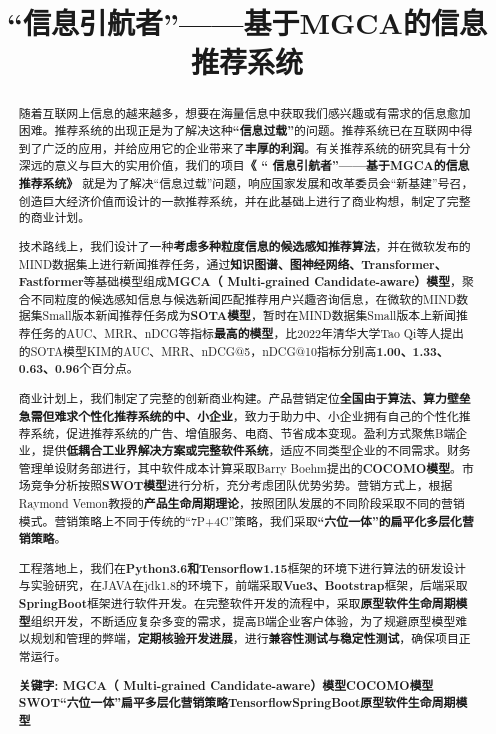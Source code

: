 \documentclass[withoutpreface,bwprint]{cumcmthesis} %
\title{“信息引航者”——基于MGCA的信息推荐系统}
\begin{document}
	
	\maketitle\thispagestyle{empty}
	\begin{abstract}
		随着互联网上信息的越来越多，想要在海量信息中获取我们感兴趣或有需求的信息愈加困难。推荐系统的出现正是为了解决这种\textbf{“信息过载”}的问题。推荐系统已在互联网中得到了广泛的应用，并给应用它的企业带来了\textbf{丰厚的利润}。有关推荐系统的研究具有十分深远的意义与巨大的实用价值，我们的项目\textbf{《 “ 信息引航者”——基于MGCA的信息推荐系统》 }就是为了解决“信息过载”问题，响应国家发展和改革委员会“新基建”号召，创造巨大经济价值而设计的一款推荐系统，并在此基础上进行了商业构想，制定了完整的商业计划。\par
		技术路线上，我们设计了一种\textbf{考虑多种粒度信息的候选感知推荐算法}，并在微软发布的MIND数据集上进行新闻推荐任务，通过\textbf{知识图谱、图神经网络、Transformer、Fastformer}等基础模型组成\textbf{MGCA（ Multi-grained Candidate-aware）模型}，聚合不同粒度的候选感知信息与候选新闻匹配推荐用户兴趣咨询信息，在微软的MIND数据集Small版本新闻推荐任务成为\textbf{SOTA模型}，暂时在MIND数据集Small版本上新闻推荐任务的AUC、MRR、nDCG等指标\textbf{最高的模型}，比2022年清华大学Tao Qi等人提出的SOTA模型KIM的AUC、MRR、nDCG@5，nDCG@10指标分别高\textbf{1.00、1.33、0.63、0.96}个百分点。\par
		商业计划上，我们制定了完整的创新商业构建。产品营销定位\textbf{全国由于算法、算力壁垒急需但难求个性化推荐系统的中、小企业}，致力于助力中、小企业拥有自己的个性化推荐系统，促进推荐系统的广告、增值服务、电商、节省成本变现。盈利方式聚焦B端企业，提供\textbf{低耦合工业界解决方案或完整软件系统}，适应不同类型企业的不同需求。财务管理单设财务部进行，其中软件成本计算采取Barry Boehm提出的\textbf{COCOMO模型}。市场竞争分析按照\textbf{SWOT模型}进行分析，充分考虑团队优势劣势。营销方式上，根据Raymond Vemon教授的\textbf{产品生命周期理论}，按照团队发展的不同阶段采取不同的营销模式。营销策略上不同于传统的“7P+4C”策略，我们采取\textbf{“六位一体”的扁平化多层化营销策略}。\par
		工程落地上，我们在\textbf{Python3.6和Tensorflow1.15}框架的环境下进行算法的研发设计与实验研究，在JAVA在jdk1.8的环境下，前端采取\textbf{Vue3、Bootstrap}框架，后端采取\textbf{SpringBoot}框架进行软件开发。在完整软件开发的流程中，采取\textbf{原型软件生命周期模型}组织开发，不断适应复杂多变的需求，提高B端企业客户体验，为了规避原型模型难以规划和管理的弊端，\textbf{定期核验开发进展}，进行\textbf{兼容性测试与稳定性测试}，确保项目正常运行。\par
		\textbf	{关键字: MGCA（ Multi-grained Candidate-aware）模型\quad  COCOMO模型\quad  SWOT\quad  “六位一体”扁平多层化营销策略\quad   Tensorflow\quad SpringBoot\quad  原型软件生命周期模型\quad	}
	\end{abstract}
	\setcounter{page}{1}
	\tableofcontents
	\newpage
\end{document}
